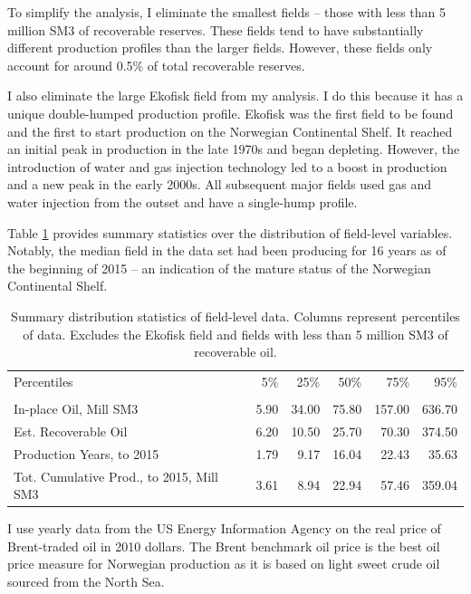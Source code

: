 \documentclass[12pt]{article}
\begin{document}
To simplify the analysis, I eliminate the smallest fields -- those with less than 5 million SM3 of recoverable reserves.  These fields tend to have substantially different production profiles than the larger fields. However, these fields only account for around 0.5\% of total recoverable reserves. 

I also eliminate the large Ekofisk field from my analysis.  I do this because it has a unique double-humped production profile. Ekofisk was the first field to be found and the first to start production on the Norwegian Continental Shelf. It reached an initial peak in production in the late 1970s and began depleting. However, the introduction of water and gas injection technology led to a boost in production and a new peak in the early 2000s. All subsequent major fields used gas and water injection from the outset and have a single-hump profile. 

Table \ref{field_summary} provides summary statistics over the distribution of field-level variables. Notably, the median field in the data set had been producing for 16 years as of the beginning of 2015 -- an indication of the mature status of the Norwegian Continental Shelf. 

\begin{table}
\begin{tabular}{lrrrrr}
\toprule
Percentiles &    5\% &    25\% &    50\% &     75\% &     95\% \\
                      &       &        &        &         &         \\
\midrule
In-place Oil, Mill SM3         &  5.90 &  34.00 &  75.80 &  157.00 &  636.70 \\
Est. Recoverable Oil           &  6.20 &  10.50 &  25.70 &   70.30 &  374.50 \\
Production Years, to 2015      &  1.79 &   9.17 &  16.04 &   22.43 &   35.63 \\
Tot. Cumulative Prod., to 2015, Mill SM3 &  3.61 &   8.94 &  22.94 &   57.46 &  359.04 \\
\bottomrule
\end{tabular}
\caption{Summary distribution statistics of field-level data. Columns represent percentiles of data. Excludes the Ekofisk field and fields with less than 5 million SM3 of recoverable oil.}
\label{field_summary}
\end{table}

I use yearly data from the US Energy Information Agency on the real price of Brent-traded oil in 2010 dollars. The Brent benchmark oil price is the best oil price measure for Norwegian production as it is based on light sweet crude oil sourced from the North Sea.  
\end{document}
